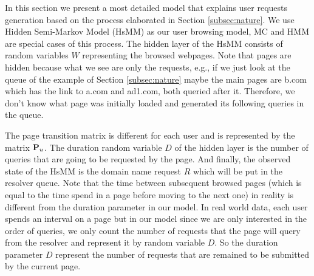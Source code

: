 	In this section we present a most detailed model that explains user requests generation based on the process elaborated in Section \ref{subsec:nature}. 	
	We use Hidden Semi-Markov Model (HsMM) as our user browsing model, MC and HMM are special cases of this process. 
	The hidden layer of the HsMM consists of random variables $W$ representing the browsed webpages.
	Note that pages are hidden because what we see are only the requests, e.g., if we just look at the queue of the example of Section \ref{subsec:nature} maybe the main pages are b.com which has the link to a.com and ad1.com, both queried after it.
	Therefore, we don't know what page was initially loaded and generated its following queries in the queue. 
	
	The page transition matrix is different for each user and is represented by the matrix $\P_u$. 
	The duration random variable $D$ of the hidden layer is the number of queries that are going to be requested by the page. 
	And finally, the observed state of the HsMM is the domain name request $R$ which will be put in the resolver queue. 
	Note that the time between subsequent browsed pages (which is equal to the time spend in a page before moving to the next one) in reality is different from the duration parameter in our model.
	In real world data, each user spends an interval on a page but in our model since we are only interested in the order of queries, we only count the number of requests that the page will query from the resolver and represent it by random variable $D$.
	So the duration parameter $D$ represent the number of requests that are remained to be submitted by the current page.
	
	
